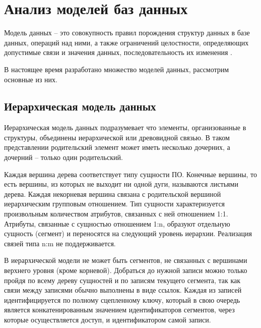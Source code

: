
\section*{Анализ моделей баз данных}

Модель данных -- это совокупность правил порождения структур данных в базе
данных, операций над ними, а также ограничений целостности, определяющих
допустимые связи и значения данных, последовательность их изменения \cite{db}.

В настоящее время разработано множество моделей данных, рассмотрим основные из них.

\subsection{Иерархическая модель данных}

Иерархическая модель данных подразумевает что элементы, организованные в структуры, объединены иерархической или древовидной связью. В таком представлении родительский элемент может иметь несколько дочерних, а дочерний -- только один родительский.

Каждая вершина дерева соответствует типу сущности ПО.  Конечные вершины, то есть вершины, из которых не выходит ни одной дуги, называются листьями дерева. Каждая некорневая вершина связана с родительской вершиной иерархическим групповым отношением. Тип сущности характеризуется произвольным количеством атрибутов, связанных с ней отношением 1:1. Атрибуты, связанные с сущностью отношением 1:n, образуют отдельную сущность (сегмент) и переносятся на следующий уровень иерархии. Реализация связей типа n:m не поддерживается.

В иерархической модели не может быть сегментов, не связанных с вершинами верхнего уровня (кроме корневой). Добраться до нужной записи можно только пройдя по всему дереву сущностей и по записям текущего сегмента, так как связи между записями обычно выполнены в виде ссылок. Каждая из записей идентифицируется по полному сцепленному ключу, который в свою очередь является конкатенированным значением идентификаторов сегментов, через которые осуществляется доступ, и идентификатором самой записи. 

